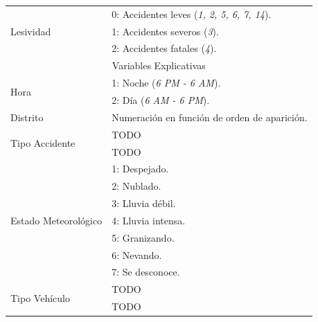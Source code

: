 \begin{enumerate}
\begin{enumerate}
\begin{table}[H]
\begin{tabular}{ll}
                           \multirow{3}{*}{Lesividad}            & 0: Accidentes leves (\textit{1, 2, 5, 6, 7, 14}).\\
                                                                 & 1: Accidentes severos (\textit{3}).\\
                                                                 & 2: Accidentes fatales (\textit{4}).\\

                           \midrule
                           \midrule
                           \multicolumn{2}{c}{Variables Explicativas}\\
                           \midrule
                           \multirow{2}{*}{Hora}                 & 1: Noche (\textit{6 PM - 6 AM}).\\
                                                                 & 2: Día (\textit{6 AM - 6 PM}).\\
                           \midrule
                           \multirow{1}{*}{Distrito}             & Numeración en función de orden de aparición.\\
                           \midrule
                           \multirow{2}{*}{Tipo Accidente}       & TODO\\
                                                                 & TODO\\
                           \midrule
                           \multirow{7}{*}{Estado Meteorológico} & 1: Despejado.\\
                                                                 & 2: Nublado.\\
                                                                 & 3: Lluvia débil.\\
                                                                 & 4: Lluvia intensa.\\
                                                                 & 5: Granizando.\\
                                                                 & 6: Nevando.\\
                                                                 & 7: Se desconoce.\\
                           \midrule
                           \multirow{2}{*}{Tipo Vehículo}        & TODO\\
                                                                 & TODO\\

\end{tabular}
\end{table}
\end{enumerate}
\end{enumerate}
